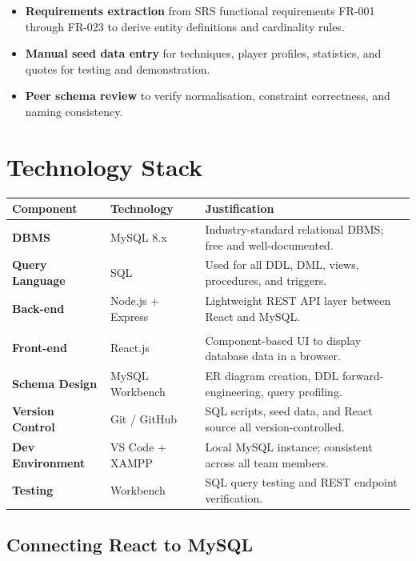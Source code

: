 \documentclass[12pt,a4paper]{article}
\begin{document}
\begin{itemize}[leftmargin=1.5em]
    \item \textbf{Requirements extraction} from SRS functional requirements
    FR-001 through FR-023 to derive entity definitions and cardinality rules.
    \item \textbf{Manual seed data entry} for techniques, player profiles,
    statistics, and quotes for testing and demonstration.
    \item \textbf{Peer schema review} to verify normalisation, constraint
    correctness, and naming consistency.
\end{itemize}

\section{Technology Stack}

\begin{longtable}{>{\bfseries}p{3.8cm} p{3.2cm} p{6.3cm}}
    \toprule
    Component & Technology & Justification \\
    \midrule
    \endhead

    DBMS & MySQL 8.x & Industry-standard relational DBMS; free and well-documented. \\[4pt]
    Query Language & SQL & Used for all DDL, DML, views, procedures, and triggers. \\[4pt]
    Back-end & Node.js + Express & Lightweight REST API layer between React and MySQL. \\[4pt]
    & &
    \\[4pt]
    Front-end & React.js & Component-based UI to display database data in a browser. \\[4pt]
    Schema Design & MySQL Workbench & ER diagram creation, DDL forward-engineering, query profiling. \\[4pt]
    Version Control & Git / GitHub & SQL scripts, seed data, and React source all version-controlled. \\[4pt]
    Dev Environment & VS Code + XAMPP & Local MySQL instance; consistent across all team members. \\[4pt]
    Testing & Workbench & SQL query testing and REST endpoint verification. \\

    \bottomrule
\end{longtable}

\subsection{Connecting React to MySQL}
\end{document}
